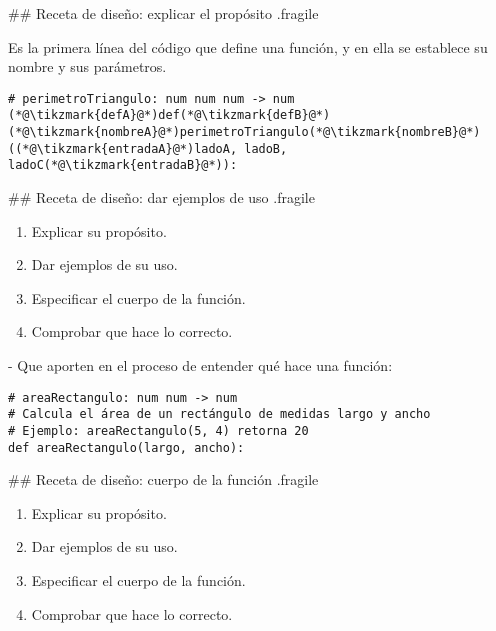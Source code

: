 ## Receta de diseño: explicar el propósito {.fragile}


\bgnblockdefinition
{} Es la primera línea del código que define una función, y
en ella se establece su nombre y sus parámetros.
\trmblockdefinition

\pause

\begin{lstlisting}[basicstyle=\normalsize\ttfamily,linewidth=.9\textwidth,xleftmargin=.1\textwidth]
# perimetroTriangulo: num num num -> num
(*@\tikzmark{defA}@*)def(*@\tikzmark{defB}@*) (*@\tikzmark{nombreA}@*)perimetroTriangulo(*@\tikzmark{nombreB}@*)((*@\tikzmark{entradaA}@*)ladoA, ladoB, ladoC(*@\tikzmark{entradaB}@*)):
\end{lstlisting}


## Receta de diseño: dar ejemplos de uso {.fragile}

    \begin{enumerate}
        \item Explicar su propósito.
        \item \alert{Dar ejemplos de su uso.}
        \item Especificar el cuerpo de la función.
        \item Comprobar que hace lo correcto.
    \end{enumerate}
\trmblockgood

- Que aporten en el proceso de entender qué hace una función:

\begin{lstlisting}[linebackgroundcolor={\btLstHL{3}}]
# areaRectangulo: num num -> num
# Calcula el área de un rectángulo de medidas largo y ancho
# Ejemplo: areaRectangulo(5, 4) retorna 20
def areaRectangulo(largo, ancho):
\end{lstlisting}

## Receta de diseño: cuerpo de la función {.fragile}

    \begin{enumerate}
        \item Explicar su propósito.
        \item Dar ejemplos de su uso.
        \item \alert{Especificar el cuerpo de la función.}
        \item Comprobar que hace lo correcto.
    \end{enumerate}
\trmblockgood

